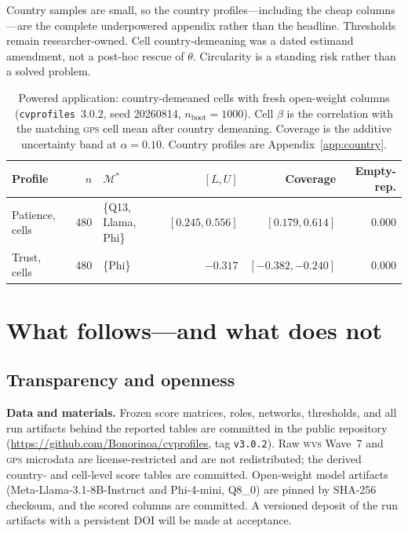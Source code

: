 \documentclass[10pt,letterpaper]{article}
\newcommand{\GPS}{\textsc{gps}}
\newcommand{\WVS}{\textsc{wvs}}
\newcommand{\cvp}{\texttt{cvprofiles}}
\newcommand{\M}{\ensuremath{\mathcal{M}}}
\begin{document}
Country samples are small, so the country profiles---including the cheap columns---are the complete underpowered appendix rather than the headline.
Thresholds remain researcher-owned.
Cell country-demeaning was a dated estimand amendment, not a post-hoc rescue of $\theta$.
Circularity is a standing risk rather than a solved problem.

\begin{table}[t]
\centering
\small
\caption{Powered application: country-demeaned cells with fresh open-weight columns (\cvp{}~3.0.2, seed 20260814, $n_{\mathrm{boot}}=1000$).
Cell $\beta$ is the correlation with the matching \GPS{} cell mean after country demeaning.
Coverage is the additive uncertainty band at $\alpha=0.10$.
Country profiles are Appendix~\ref{app:country}.}
\label{tab:twores}
\begin{tabularx}{\textwidth}{@{}>{\raggedright\arraybackslash}p{2.9cm} r >{\raggedright\arraybackslash}p{3.6cm} r r r@{}}
\toprule
\textbf{Profile} & $n$ & $\M^*$ & $[L,U]$ & \textbf{Coverage} & \textbf{Empty-rep.} \\
\midrule
Patience, cells & 480 & \{Q13, Llama, Phi\} & $[0.245,0.556]$ & $[0.179,0.614]$ & $0.000$ \\
Trust, cells & 480 & \{Phi\} & $-0.317$ & $[-0.382,-0.240]$ & $0.000$ \\
\bottomrule
\end{tabularx}
\end{table}

\section{What follows---and what does not}
\label{sec:discussion}

\subsection{Transparency and openness}
\label{sec:transparency}
\textbf{Data and materials.}
Frozen score matrices, roles, networks, thresholds, and all run artifacts behind the reported tables are committed in the public repository (\url{https://github.com/Bonorinoa/cvprofiles}, tag \texttt{v3.0.2}).
Raw \WVS{} Wave~7 and \GPS{} microdata are license-restricted and are not redistributed; the derived country- and cell-level score tables are committed.
Open-weight model artifacts (Meta-Llama-3.1-8B-Instruct and Phi-4-mini, Q8\_0) are pinned by SHA-256 checksum, and the scored columns are committed.
A versioned deposit of the run artifacts with a persistent DOI will be made at acceptance.
\end{document}
